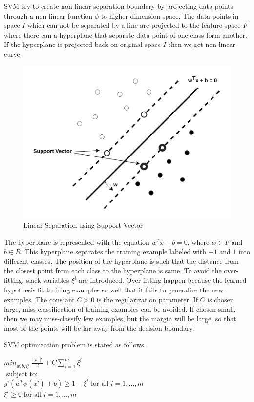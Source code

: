 \documentclass[10pt,oneside,a4paper]{article}
\begin{document}
SVM try to create non-linear separation boundary by projecting data points through a non-linear function $\phi$ to higher dimension space. The data points in space $I$ which can not be separated by a line are projected to the feature space $F$ where there can a hyperplane that separate data point of one class form another. If the hyperplane is projected back on original space $I$ then we get non-linear curve.\cite{SVM}

\begin{figure}[H]
\centering
\includegraphics[scale=0.5]{SVM}
\caption{Linear Separation using Support Vector} \label{fig:SVM}
\end{figure}

The hyperplane is represented with the equation $w^{T}x + b = 0$, where $w \in F$ and $b \in R$. This hyperplane separates the training example labeled with $-1$ and $1$ into different classes. The position of the hyperplane is such that the distance from the closest point from each class to the hyperplane is same. To avoid the over-fitting, slack variables $\xi^{i}$ are introduced. Over-fitting happen because the learned hypothesis fit training examples so well that it fails to generalize the new examples. The constant $C > 0$ is the regularization parameter. If $C$ is chosen large, miss-classification of training examples can be avoided. If chosen small, then we may miss-classify few examples, but the margin will be large, so that most of the points will be far away from the decision boundary.

SVM optimization problem is stated as follows.\cite{SVM} \cite{svm-ml}

\begin{center}
  ${min}_{w,b,\xi^i} \ \frac{||w||^2}{2} + C \sum_{i=1}^m \xi^i$ \\
  $\mbox{ subject to: }$ \\
  $y^i( w^T \phi(x^i) + b) \geq 1 - \xi^i \mbox{ for all } i = 1, \dots, m$ \\
  \hspace{3cm} $\xi^i \geq 0 \mbox{ for all } i = 1, \dots, m$ \\
\end{center}
\end{document}
